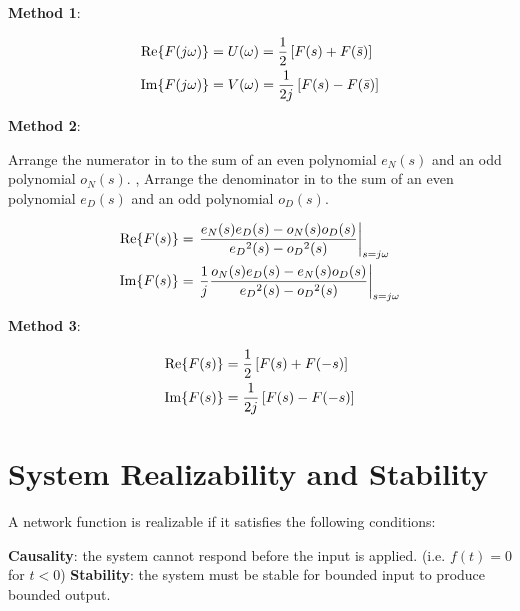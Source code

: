 \documentclass{report}
\begin{document}
\begin{itemize}
	\ii \textbf{Method 1}:

	\begin{align*}
		\Re\{F(j\omega)\} & = U(\omega) = \frac{1}{2} \left[ F(s) + F(\bar{s}) \right]  \\
		\Im\{F(j\omega)\} & = V(\omega) = \frac{1}{2j} \left[ F(s) - F(\bar{s}) \right]
	\end{align*}

	\ii \textbf{Method 2}:
	\begin{itemize}
		\ii Arrange the numerator in to the sum of an even polynomial $e_N(s)$ and an odd polynomial $o_N(s)$.
		,		\ii Arrange the denominator in to the sum of an even polynomial $e_D(s)$ and an odd polynomial $o_D(s)$.
	\end{itemize}
	\begin{align*}
		\Re\{F(s)\} & = \left.\frac{e_N(s)e_D(s) - o_N(s)o_D(s)}{{e_D}^2(s) - {o_D}^2(s)}\right|_{s=j\omega}             \\
		\Im\{F(s)\} & = \left.\frac{1}{j} \frac{o_N(s)e_D(s) - e_N(s)o_D(s)}{{e_D}^2(s) - {o_D}^2(s)}\right|_{s=j\omega}
	\end{align*}

	\ii \textbf{Method 3}:

	\begin{align*}
		\Re\{F(s)\} & = \frac{1}{2} \left[ F(s) + F(-s) \right]  \\
		\Im\{F(s)\} & = \frac{1}{2j} \left[ F(s) - F(-s) \right]
	\end{align*}
\end{itemize}

\section{System Realizability and Stability}

A network function is realizable if it satisfies the following conditions:
\begin{itemize}
	\ii \textbf{Causality}: the system cannot respond before the input is applied. (i.e. $f(t) = 0$ for $t < 0$)
	\ii \textbf{Stability}: the system must be stable for bounded input to produce bounded output.
\end{itemize}
\end{document}

